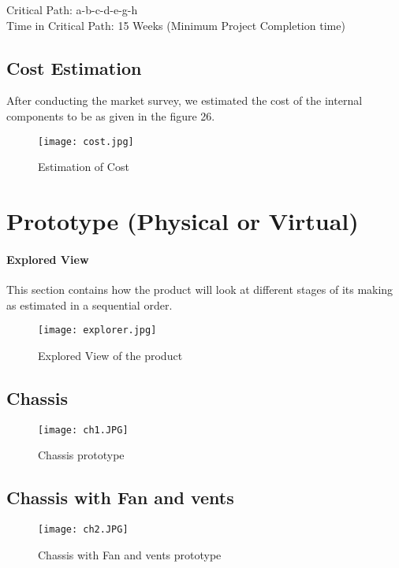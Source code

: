 \documentclass[12pt]{article}
\begin{document}
Critical Path: a-b-c-d-e-g-h \\

Time in Critical Path: 15 Weeks (Minimum Project Completion time)

\newpage

\subsection{Cost Estimation}

After conducting the market survey, we estimated the cost of the internal components to be as given in the figure 26.

\begin{figure}[!htb]
\centering
\texttt{[image: cost.jpg]}
\caption{\label{fig:}Estimation of Cost}
\end{figure}

\newpage

\section{Prototype (Physical or Virtual)}

\paragraph{Explored View}

This section contains how the product will look at different stages of its making as estimated in a sequential order.

\begin{figure}[!htb]
\centering
\texttt{[image: explorer.jpg]}
\caption{\label{fig:}Explored View of the product}
\end{figure}

\subsection{Chassis}
\begin{figure}[!htb]
\centering
\texttt{[image: ch1.JPG]}
\caption{\label{fig:}Chassis prototype}
\end{figure}

\subsection{Chassis with Fan and vents}

\begin{figure}[!htb]
\centering
\texttt{[image: ch2.JPG]}
\caption{\label{fig:}Chassis with Fan and vents prototype}
\end{figure}
\end{document}
